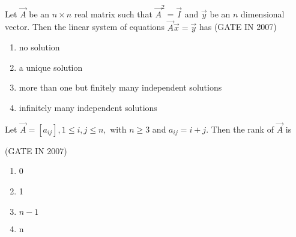  \item Let $\vec{A}$ be an $n \times n$ real matrix such that $\vec{A}^2 = \vec{I}$ and $\vec{y}$ be an $n$ dimensional vector. Then the linear system of equations $\vec{A}\vec{x} = \vec{y}$ has  
\hfill(GATE IN 2007)
\begin{enumerate}
\item no solution
\item a unique solution
\item more than one but finitely many independent solutions
\item infinitely many independent solutions
\end{enumerate}
\item Let $\vec{A} = [a_{ij}], 1 \leq i,j \leq n,$ with $n \geq 3$ and $a_{ij} = i+j$. Then the rank of $\vec{A}$ is  

\hfill(GATE IN 2007)
	\begin{multicols}{4}
\begin{enumerate}
\item 0  
\item 1  
\item $n-1$  
\item n  
\end{enumerate}
\end{multicols}

